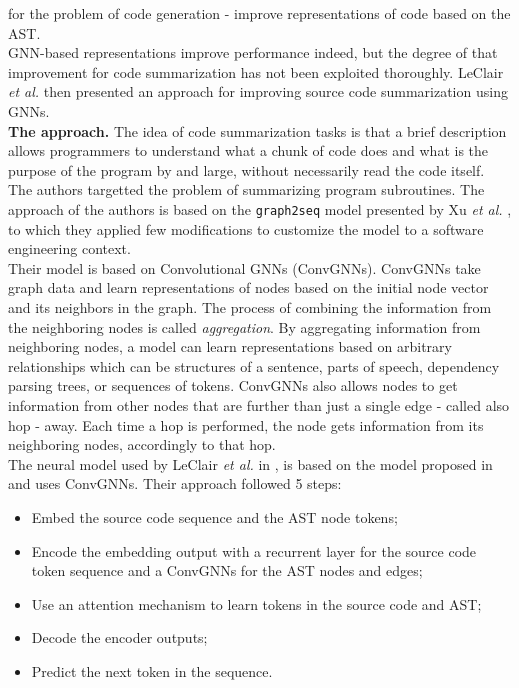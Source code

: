 for the problem of code generation - improve representations of code based on the AST.\\
GNN-based representations improve performance indeed, but the degree of that improvement 
for code summarization has not been exploited thoroughly. 
LeClair \textit{et al.} \cite{Leclair2020} then presented an approach for improving source code summarization using 
GNNs.\\
\newline
\textbf{The approach.}
The idea of code summarization tasks is that a brief description allows programmers to understand
what a chunk of code does and what is the purpose of the program by and large, without necessarily read the code 
itself. The authors targetted the problem of summarizing program subroutines.
The approach of the authors is based on the \texttt{graph2seq} model presented by Xu \textit{et al.} \cite{xu2018graph2seq}, to which they applied few modifications 
to customize the model to a software engineering context.\\
Their model is based on Convolutional GNNs (ConvGNNs). ConvGNNs take graph data and learn representations 
of nodes based on the initial node vector and its neighbors in the graph. 
The process of combining the information from the neighboring nodes is called \textit{aggregation}. By aggregating
information from neighboring nodes, a model can learn representations based on arbitrary relationships which can be structures of a sentence, parts of speech, dependency parsing 
trees, or sequences of tokens. ConvGNNs also allows nodes to get information from other nodes 
that are further than just a single edge - called also hop - away. Each time a hop is performed, 
the node gets information from its neighboring nodes, accordingly to that hop.\\
The neural model used by LeClair \textit{et al.} in \cite{Leclair2020}, is based on the model proposed in
\cite{leclair2019neural} and uses ConvGNNs. Their approach followed 5 steps:
\begin{itemize}
    \item Embed the source code sequence and the AST node tokens;
    \item Encode the embedding output with a recurrent layer for the source code token sequence and a ConvGNNs for the AST nodes and edges;
    \item Use an attention mechanism to learn tokens in the source code and AST;
    \item Decode the encoder outputs;
    \item Predict the next token in the sequence.
\end{itemize} 
